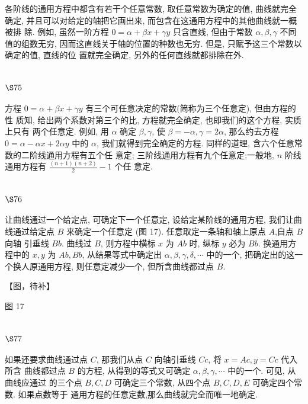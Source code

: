 各阶线的通用方程中都含有若干个任意常数, 取任意常数为确定的值, 曲线就完全 确定, 并且可以对给定的轴把它画出来, 而包含在这通用方程中的其他曲线就一概被排 除. 例如, 虽然一阶方程 $0=\alpha+\beta x+\gamma y$ 只含直线, 但由于常数 $\alpha, \beta, \gamma$ 不同值的组数无穷, 因而这直线关于轴的位置的种数也无穷. 但是, 只赋予这三个常数以确定的值, 直线的位 置就完全确定, 另外的任何直线就都排除在外.

\section{$\S 75$}

方程 $0=\alpha+\beta x+\gamma y$ 有三个可任意决定的常数(简称为三个任意定), 但由方程的性 质知, 给出两个系数对第三个的比, 方程就完全确定, 也即我们的这个方程, 实质上只有 两个任意定. 例如, 用 $\alpha$ 确定 $\beta, \gamma$, 使 $\beta=-\alpha, \gamma=2 \alpha$, 那么约去方程 $0=\alpha-\alpha x+2 \alpha y$ 中的 $\alpha$, 我们就得到完全确定的方程. 同样的道理, 含六个任意常数的二阶线通用方程有五个任 意定; 三阶线通用方程有九个任意定;一般地, $n$ 阶线通用方程有 $\frac{(n+1)(n+2)}{2}-1$ 个任 意定.

\section{$\S 76$}

让曲线通过一个给定点, 可确定下一个任意定, 设给定某阶线的通用方程, 我们让曲 线通过给定点 $B$ 来确定一个任意定 (图 17). 任意取定一条轴和轴上原点 $A$,自点 $B$ 向轴 引垂线 $B b$. 曲线过 $B$, 则方程中横标 $x$ 为 $A b$ 时, 纵标 $y$ 必为 $B b$. 换通用方程中的 $x, y$ 为 $A b, B b$, 从结果等式中确定出 $\alpha, \beta, \gamma, \delta, \cdots$ 中的一个, 把确定出的这一个换人原通用方程, 则任意定减少一个, 但所含曲线都过点 $B$.


【图，待补】

图 17 

\section{$\S 77$}

如果还要求曲线通过点 $C$, 那我们从点 $C$ 向轴引垂线 $C c$, 将 $x=A c, y=C c$ 代入所含 曲线都过点 $B$ 的方程, 从得到的等式又可确定 $\alpha, \beta, \gamma, \cdots$ 中的一个. 可见, 从曲线应通过 的三个点 $B, C, D$ 可确定三个常数, 从四个点 $B, C, D, E$ 可确定四个常数. 如果点数等于 通用方程的任意定数,那么曲线就完全而唯一地确定.

